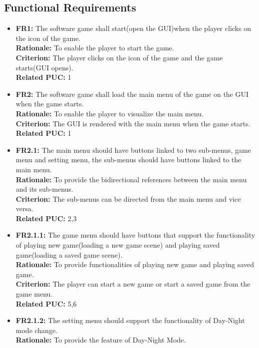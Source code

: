 \documentclass[12pt, titlepage]{article}
\begin{document}
\subsection{Functional Requirements}
\begin{itemize}
        \item \textbf{FR1:} The software game shall start(open the GUI)when the player clicks on the icon of the game.\\
        \textbf{Rationale:} To enable the player to start the game.\\
        \textbf{Criterion:} The player clicks on the icon of the game and the game starts(GUI opens).\\
        \textbf{Related PUC:} 1
        \item \textbf{FR2:} The software game shall load the main menu of the game on the GUI when the game starts.\\
        \textbf{Rationale:} To enable the player to visualize the main menu.\\
        \textbf{Criterion:} The GUI is rendered with the main menu when the game starts.\\
        \textbf{Related PUC:} 1
        \item \textbf{FR2.1:} The main menu should have buttons linked to two sub-menus, game menu and setting menu, the sub-menus should have buttons linked to the main menu.\\
        \textbf{Rationale:} To provide the bidirectional references between the main menu and its sub-menus.\\
        \textbf{Criterion:} The sub-menus can be directed from the main menu and vice versa.\\
        \textbf{Related PUC:} 2,3
        \item \textbf{FR2.1.1:} The game menu should have buttons that support the functionality of playing new game(loading a new game scene) and playing saved game(loading a saved game scene).\\
        \textbf{Rationale:} To provide functionalities of playing new game and playing saved game.\\
        \textbf{Criterion:} The player can start a new game or start a saved game from the game menu.\\
        \textbf{Related PUC:} 5,6
        \item \textbf{FR2.1.2:} The setting menu should support the functionality of Day-Night mode change.\\
        \textbf{Rationale:} To provide the feature of Day-Night Mode.\\

\end{itemize}
\end{document}
